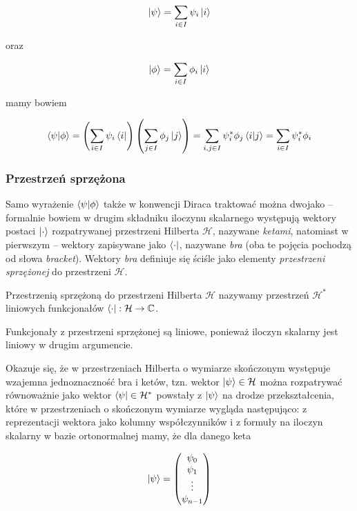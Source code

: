 $$
    \ket{\psi} = \sum\limits_{i\in I}\psi_{i}\ket{i}
$$

oraz

$$
    \ket{\phi} = \sum\limits_{i\in I}\phi_{i}\ket{i}
$$

mamy bowiem

$$
    \bra{\psi}\ket{\phi} = \left(\sum\limits_{i \in I}\psi_{i}\bra{i}\right)\left(\sum\limits_{j\in I}\phi_{j}\ket{j}\right) = \sum\limits_{i, j \in I}\psi_{i} ^ {*}\phi_{j}\bra{i}\ket{j}=\sum\limits_{i \in I}\psi_{i}^{*}\phi_{i}
$$

\subsubsection{Przestrzeń sprzężona}

Samo wyrażenie $\bra{\psi}\ket{\phi}$ także w konwencji Diraca traktować można dwojako -- formalnie bowiem w drugim składniku iloczynu skalarnego występują wektory postaci $\ket{\cdot}$ rozpatrywanej przestrzeni Hilberta $\mathcal{H}$, nazywane \textit{ketami}, natomiast w pierwszym -- wektory zapisywane jako $\bra{\cdot}$, nazywane \textit{bra} (oba te pojęcia pochodzą od słowa \textit{bracket}). Wektory \textit{bra} definiuje się ściśle jako elementy \textit{przestrzeni sprzężonej} do przestrzeni $\mathcal{H}$.

\begin{definition}
    Przestrzenią sprzężoną do przestrzeni Hilberta $\mathcal{H}$ nazywamy przestrzeń $\mathcal{H}^{*}$ liniowych funkcjonałów $\bra{\cdot} : \mathcal{H} \rightarrow \mathbb{C}$.
\end{definition}

\begin{remark} 
    Funkcjonały z przestrzeni sprzężonej są liniowe, ponieważ iloczyn skalarny jest liniowy w drugim argumencie.
\end{remark}

Okazuje się, że w przestrzeniach Hilberta o wymiarze skończonym występuje wzajemna jednoznaczność bra i ketów, tzn. wektor $\ket{\psi} \in \mathcal{H}$ można rozpatrywać równoważnie jako wektor $\bra{\psi} \in \mathcal{H}^{*}$ powstały z $\ket{\psi}$ na drodze przekształcenia, które w przestrzeniach o skończonym wymiarze wygląda następująco: z reprezentacji wektora jako kolumny współczynników i z formuły na iloczyn skalarny w bazie ortonormalnej mamy, że dla danego keta 

$$
    \ket{\psi} =
    \begin{pmatrix}
        \psi_{0} \\
        \psi_{1} \\
        \vdots \\
        \psi_{n - 1} \\
    \end{pmatrix}
$$
 

